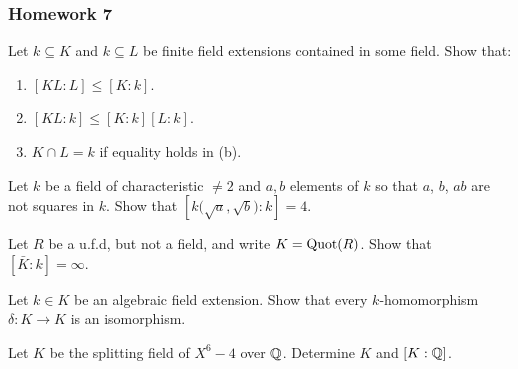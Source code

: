 \subsubsection{Homework 7}
\setcounter{exercise}{0}
\setcounter{equation}{0}

\begin{problem}
  Let $k\subseteq K$ and $k\subseteq L$ be finite field extensions
  contained in some field. Show that:
  \begin{enumerate}[label=(\alph*),noitemsep]
  \item $[KL:L]\leq[K:k]$.
  \item $[KL:k]\leq[K:k][L:k]$.
  \item $K\cap L=k$ if equality holds in (b).
  \end{enumerate}
\end{problem}
\begin{solution}
\end{solution}

\begin{problem}
  Let $k$ be a field of characteristic $\neq 2$ and $a,b$ elements of
  $k$ so that $a$, $b$, $ab$ are not squares in $k$. Show that
  $\left[k{\bigl(\sqrt{a},\sqrt{b}\bigr)}:k\right]=4$.
\end{problem}
\begin{solution}
\end{solution}

\begin{problem}
  Let $R$ be a u.f.d, but not a field, and write $ K=\operatorname{Quot}(R)$. Show that
  $[\bar K:k]=\infty$.
\end{problem}
\begin{solution}
\end{solution}

\begin{problem}
  Let $k\in K$ be an algebraic field extension. Show that every
  $k$-homomorphism $\delta\colon K\to K$ is an isomorphism.
\end{problem}
\begin{solution}
\end{solution}

\begin{problem}
  Let $ K$ be the splitting field of $X^6-4$ over $\mathbb{Q}$. Determine
  $ K$ and $[ K:\mathbb{Q}]$.
\end{problem}
\begin{solution}
\end{solution}

